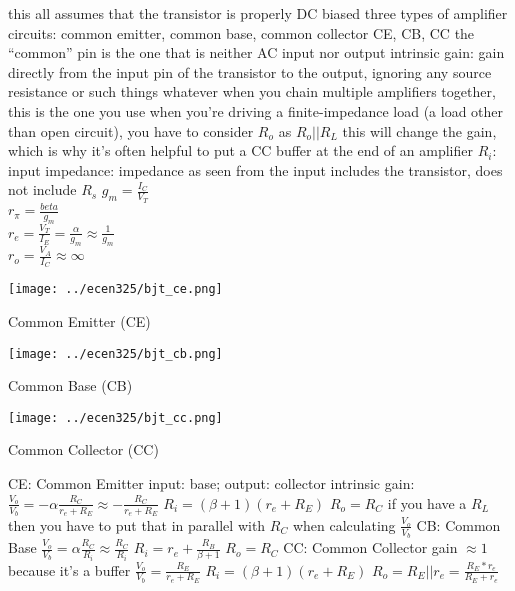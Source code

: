 \documentclass[12pt]{article}
\begin{document}
\begin{spacing}{0.8}
\begin{multicols*}{2}
\begin{flushleft}
\begin{outline}[longenum]
  \1 this all assumes that the transistor is properly DC biased
  \1 three types of amplifier circuits: common emitter, common base, common collector
    \2 CE, CB, CC
    \2 the ``common'' pin is the one that is neither AC input nor output
  \1 intrinsic gain: gain directly from the input pin of the transistor to the output, ignoring any source resistance or such things whatever
    \2 when you chain multiple amplifiers together, this is the one you use
  \1 when you're driving a finite-impedance load (a load other than open circuit), you have to consider $R_o$ as $R_o||R_L$
    \2 this will change the gain, which is why it's often helpful to put a CC buffer at the end of an amplifier
  \1 $R_i$: input impedance: impedance as seen from the input
    \2 includes the transistor, does not include $R_s$
  \1 $g_m = \frac{I_C}{V_T}$
  \\ $r_\pi = \frac{beta}{g_m}$
  \\ $r_e = \frac{V_T}{I_E} = \frac{\alpha}{g_m} \approx \frac{1}{g_m}$
  \\ $r_o = \frac{V_A}{I_C} \approx \infty$
\0
\begin{minipage}{0.3\columnwidth}
  \texttt{[image: ../ecen325/bjt\_ce.png]}
\begin{center}
\vspace{-20px}
{\footnotesize Common Emitter (CE) }
\end{center}
\end{minipage}
\begin{minipage}{0.3\columnwidth}
\texttt{[image: ../ecen325/bjt\_cb.png]}
\begin{center} 
{\footnotesize Common Base (CB) }
\end{center}
\end{minipage}
\begin{minipage}{0.3\columnwidth}
\texttt{[image: ../ecen325/bjt\_cc.png]}
\begin{center} 
{\footnotesize Common Collector (CC) }
\end{center}
\end{minipage}
  \1 CE: Common Emitter
    \2 input: base; output: collector
    \2 intrinsic gain: $\frac{V_o}{V_b}= -\alpha\frac{R_C}{r_e + R_E} \approx -\frac{R_C}{r_e + R_E}$
    \2 $R_i=(\beta+1)(r_e+R_E)$
    \2 $R_o = R_C$
    \2 if you have a $R_L$ then you have to put that in parallel with $R_C$ when calculating $\frac{V_o}{V_b}$
  \1 CB: Common Base
    \2 $\frac{V_o}{V_b} = \alpha\frac{R_C}{R_i} \approx \frac{R_C}{R_i}$
    \2 $R_i = r_e + \frac{R_B}{\beta+1}$
    \2 $R_o=R_C$
  \1 CC: Common Collector
    \2 gain $\approx 1$ because it's a buffer
    \2 $\frac{V_o}{V_b} = \frac{R_E}{r_e+R_E}$
    \2 $R_i = (\beta+1)(r_e+R_E)$
    \2 $R_o = R_E||r_e = \frac{R_E*r_e}{R_E+r_e}$




\end{outline}
\end{flushleft}
\end{multicols*}
\end{spacing}
\end{document}
